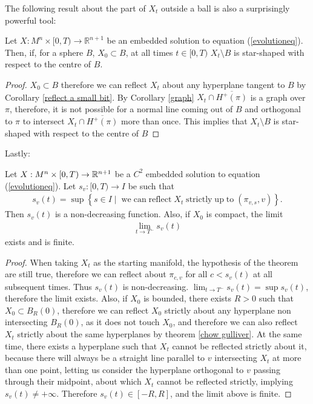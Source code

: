 The following result about the part of $X_t$ outside a ball is also a surprisingly powerful tool: 



\begin{cor}
	Let $ X : M^n \times [0, T) \to \mathbb{R}^{n+1} $ be an embedded solution to equation (\ref{evolutioneq}). Then, if, for a sphere $B$, $X_0\subset B$, at all times $t \in [0, T)$ $X_t\setminus B$ is star-shaped with respect to the centre of $B$.\label{starshaped}
\end{cor}

\begin{proof}
	$X_0\subset B$ therefore we can reflect $X_t$ about any hyperplane tangent to $B$ by Corollary \ref{reflect a small bit}. By Corollary \ref{graph} $X_t\cap\overline{H^+(\pi)}$ is a graph over $\pi$, therefore, it is not possible for a normal line coming out of $B$ and orthogonal to $\pi$ to intersect  $X_t\cap\overline{H^+(\pi)}$ more than once. This implies that  $X_t\setminus B$ is star-shaped with respect to the centre of $B$
\end{proof}

Lastly: 
\begin{cor}
	Let $X:M^n\times [0,T) \rightarrow \mathbb{R}^{n+1}$ be a $C^2$ embedded solution to  equation (\ref{evolutioneq}). Let $s_v:[0,T) \rightarrow I$ be such that 
	\begin{align*}
		s_v(t)= \sup\left\{s \in I \;|\;  \; \mathrm{we \; can \; reflect \;} X_t \mathrm{ \; strictly \; up \; to }\; (\pi_{v, s}, v) \right\}.
	\end{align*}
	Then $s_v(t)$ is a non-decreasing function. Also, if $X_0$ is compact, the limit
	\begin{align*}
		\lim_{t\rightarrow T^-} s_v(t)
	\end{align*}
	exists and is finite.
\end{cor}
\begin{proof}
	When taking $X_t$ as the starting manifold, the hypothesis of the theorem are still true, therefore we can reflect about $\pi_{c, v}$  for all $c<s_v(t)$ at all subsequent times. Thus $s_v(t)$ is non-decreasing. $\lim_{t\rightarrow T^-} s_v(t) = \sup s_v(t)$, therefore the limit exists. Also, if $X_0$ is bounded, there exists $R>0$ such that $X_0\subset B_R(0)$, therefore we can reflect $X_0$ strictly about any hyperplane non intersecting $B_R(0)$, as it does not touch $X_0$, and therefore we can also reflect $X_t$ strictly about the same hyperplanes by theorem \ref{chow gulliver}. At the same time, there exists a hyperplane such that $X_t$ cannot be reflected strictly about it, because there will always be a straight line parallel to $v$ intersecting $X_t$ at more than one point, letting us consider the hyperplane orthogonal to $v$ passing through their midpoint, about which $X_t$ cannot be reflected strictly, implying $s_v(t) \neq +\infty$. Therefore  $s_v(t)\in [-R, R]$, and the limit above is finite. 
\end{proof}





